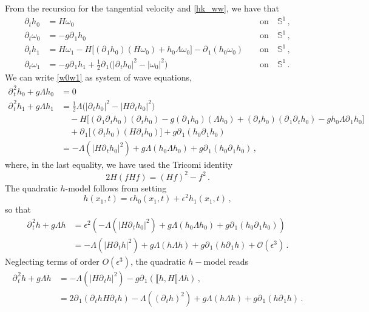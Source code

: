 \documentclass[11pt]{article}
\theoremstyle{plain}
\theoremstyle{definition}
\theoremstyle{definition}
\def\O{{\mathcal O}}
\def\p{\text{\bf\emph{p}}}
\def\p{{\partial\hspace{1pt}}}
\def\comm#1#2{{\llbracket#1,#2\rrbracket}}
\begin{document}
From the recursion for the tangential velocity and \eqref{hk_ww}, we have that
\begin{subequations}
\label{w0w1}
\begin{alignat}{2}
\partial_t h_{0} &= H \omega_0 &&\text{ on}\quad\mathbb{S}^1\,,\\
\partial_t\omega_{0} &= -g \p_{\!1} h_0 &&\text{ on}\quad\mathbb{S}^1\,,\\
\partial_t h_{1} &= H \omega_1- H\big[(\p_{\!1}h_0)(H \omega_0) + h_0 \Lambda \omega_0 \big] - \p_{\!1} (h_0 \omega_0) &&\text{ on}\quad\mathbb{S}^1\,,\\
\partial_t\omega_{1} &= -g \p_{\!1} h_1 + \frac{1}{2} \p_{\!1} \big(|\p_t h_0|^2 - |\omega_0|^2 \big) \qquad&&\text{ on}\quad\mathbb{S}^1\,.
\end{alignat}
\end{subequations}
We can write \eqref{w0w1} as system of wave equations,
\begin{subequations}
\label{h0h1}
\begin{align}
\p_{\!t}^2 h_0 + g \Lambda h_0 &=0 \\
\p_{\!t}^2 h_1 + g \Lambda h_1 &= \frac{1}{2} \Lambda  \big(|\p_{\!t} h_0|^2 - |H \p_{\!t} h_0|^2\big) \nonumber\\
&\quad - H\big[(\p_{\!1} \p_{\!t} h_0)(\p_{\!t} h_0) - g (\p_{\!1} h_0)(\Lambda h_0) + (\p_{\!t} h_0) (\p_{\!1} \p_{\!t} h_0) - g h_0 \Lambda \p_{\!1} h_0 \big] \nonumber\\
&\quad + \p_{\!1} \big[(\p_{\!t} h_0)(H \p_{\!t} h_0)\big] + g \p_{\!1} (h_0 \p_{\!1} h_0) \nonumber\\
&=  - \Lambda (|H \p_{\!t}h_0|^2) + g \Lambda (h_0 \Lambda h_0) + g \p_{\!1} (h_0 \p_{\!1} h_0) \,,
\end{align}
\end{subequations}
where, in the last equality, we have used the Tricomi identity
\begin{equation}\label{tricomi}
2H( f Hf) =  (Hf)^2 -   f^2 \,.
\end{equation}
The quadratic $h$-model follows from setting
\begin{equation}\label{hdefinition}
h(x_1,t)=  \epsilon h_0(x_1,t) + \epsilon ^2 h_1(x_1,t) \,,
\end{equation}
so that
\begin{align*}
\p_{\!t}^2 h + g \Lambda h &=    \epsilon ^2 \left(  - \Lambda (|H \p_{\!t}h_0|^2) + g \Lambda (h_0 \Lambda h_0) + g \p_{\!1} (h_0 \p_{\!1} h_0)\right) \\
&=  - \Lambda (|H \p_{\!t}h|^2) + g \Lambda (h \Lambda h) + g \p_{\!1} (h \p_{\!1} h)  + \O(\epsilon ^3)\,.
\end{align*}
Neglecting terms of order $O(\epsilon^3)$, the quadratic $h-$model reads
\begin{subequations}
\label{hmodel-quad}
\begin{align}
\p_{\!t}^2 h + g \Lambda h &=  - \Lambda (|H \p_{\!t}h|^2) - g\p_{\!1} (\comm{h}{H} \Lambda h) \,,\\
&=  2\p_{\!1}( \p_{\!t} h H \p_{\!t} h) - \Lambda \left( (\p_{\!t} h)^2\right) + g \Lambda (h \Lambda h) + g \p_{\!1} (h \p_{\!1} h)\,.
\end{align}
\end{subequations}
\end{document}
